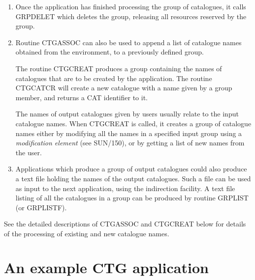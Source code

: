 \documentclass[twoside,11pt]{article}
\newcommand{\htmlref}[2]{#1}
\newcommand{\xref}[3]{#1}
\renewcommand{\_}{\texttt{\symbol{95}}}
\begin{document}
\begin{enumerate}
\item Once the application has finished processing the group of
catalogues, it calls \xref{GRP\_DELET}{sun150}{GRP\_DELET} which deletes 
the group, releasing all resources reserved by the group.

\item Routine CTG\_ASSOC can also be used to append a list of catalogue names 
obtained from the environment, to a previously defined group.

The routine \htmlref{CTG\_CREAT}{CTG_CREAT} produces a group
containing the names of catalogues that are to be created by the
application. The routine \htmlref{CTG\_CATCR}{CTG_CATCR} will create
a new catalogue with a name given by a group member, and returns a CAT
identifier to it.

The names of output catalogues given by users usually relate to the
input catalogue names.  When CTG\_CREAT is called, it creates a group
of catalogue names either by modifying all the names in a specified
input group using a \emph{modification element} (see
\xref{SUN/150}{sun150}{}), or by getting a list of new names from the
user. 

\item Applications which produce a group of output catalogues could
also produce a text file holding the names of the output catalogues. Such a
file can be used as input to the next application, using the
indirection facility. A text file listing of all the catalogues in a group
can be produced by routine \xref{GRP\_LIST}{sun150}{GRP_LIST} (or 
\xref{GRP\_LISTF}{sun150}{GRP_LISTF}).

\end{enumerate}

See the detailed descriptions of \htmlref{CTG\_ASSOC}{CTG_ASSOC} and
\htmlref{CTG\_CREAT}{CTG_CREAT} below for details of the processing
of existing and new catalogue names.

\section{An example CTG application}
\end{document}
